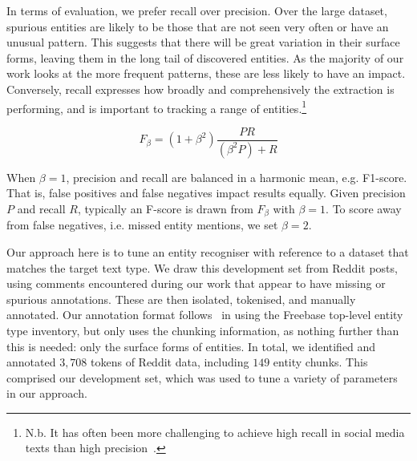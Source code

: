 \documentclass[10pt,journal,compsoc]{IEEEtran}
\begin{document}
In terms of evaluation, we prefer recall over precision.
Over the large dataset, spurious entities are likely to be those that are not seen very often or have an unusual pattern.
This suggests that there will be great variation in their surface forms, leaving them in the long tail of discovered entities.
As the majority of our work looks at the more frequent patterns, these are less likely to have an impact.
Conversely, recall expresses how broadly and comprehensively the extraction is performing, and is important to tracking a range of entities.\footnote{N.b. It has often been more challenging to achieve high recall in social media texts than high precision~\cite{ritter2011named,derczynski2015analysis}.}

\begin{equation}
F_\beta = (1+\beta^2)\frac{PR}{(\beta^2 P) + R} 
\end{equation}


When $\beta=1$, precision and recall are balanced in a harmonic mean, e.g. F1-score.
That is, false positives and false negatives impact results equally.
Given precision $P$ and recall $R$, typically an F-score is drawn from $F_\beta$ with $\beta=1$.
To score away from false negatives, i.e. missed entity mentions, we set $\beta=2$.

Our approach here is to tune an entity recogniser with reference to a dataset that matches the target text type.
We draw this development set from Reddit posts, using comments encountered during our work that appear to have missing or spurious annotations.
These are then isolated, tokenised, and manually annotated.
Our annotation format follows~\cite{ritter2011named} in using the Freebase top-level entity type inventory, but only uses the chunking information, as nothing further than this is needed: only the surface forms of entities.
In total, we identified and annotated $3,708$ tokens of Reddit data, including $149$ entity chunks.
This comprised our development set, which was used to tune a variety of parameters in our approach.
\end{document}
